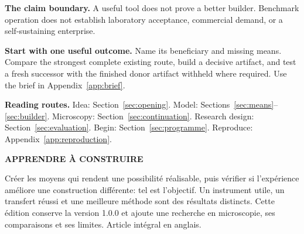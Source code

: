 \textbf{The claim boundary.} A useful tool does not prove a better builder. Benchmark operation does not establish laboratory acceptance, commercial demand, or a self-sustaining enterprise.

\begin{practicebox}
\textbf{Start with one useful outcome.} Name its beneficiary and missing means. Compare the strongest complete existing route, build a decisive artifact, and test a fresh successor with the finished donor artifact withheld where required. Use the brief in Appendix~\ref{app:brief}.
\end{practicebox}

\textbf{Reading routes.} Idea: Section~\ref{sec:opening}. Model: Sections~\ref{sec:means}--\ref{sec:builder}. Microscopy: Section~\ref{sec:continuation}. Research design: Section~\ref{sec:evaluation}. Begin: Section~\ref{sec:programme}. Reproduce: Appendix~\ref{app:reproduction}.

\begingroup\small
\textbf{APPRENDRE \`A CONSTRUIRE}\par
Cr\'eer les moyens qui rendent une possibilit\'e r\'ealisable, puis v\'erifier si l'exp\'erience am\'eliore une construction diff\'erente: tel est l'objectif. Un instrument utile, un transfert r\'eussi et une meilleure m\'ethode sont des r\'esultats distincts. Cette \'edition conserve la version 1.0.0 et ajoute une recherche en microscopie, ses comparaisons et ses limites. Article int\'egral en anglais.
\endgroup
